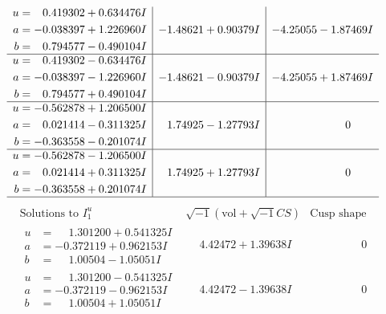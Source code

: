 \documentclass[1p]{elsarticle_modified}
\theoremstyle{definition}
\newcommand{\I}{\sqrt{-1}}
\begin{document}
$$\begin{array}{c|c|c}
\begin{aligned}
u &= \phantom{-}0.419302 + 0.634476 I \\
a &= -0.038397 + 1.226960 I \\
b &= \phantom{-}0.794577 - 0.490104 I\end{aligned}
 & -1.48621 + 0.90379 I & -4.25055 - 1.87469 I \\ \hline\begin{aligned}
u &= \phantom{-}0.419302 - 0.634476 I \\
a &= -0.038397 - 1.226960 I \\
b &= \phantom{-}0.794577 + 0.490104 I\end{aligned}
 & -1.48621 - 0.90379 I & -4.25055 + 1.87469 I \\ \hline\begin{aligned}
u &= -0.562878 + 1.206500 I \\
a &= \phantom{-}0.021414 - 0.311325 I \\
b &= -0.363558 - 0.201074 I\end{aligned}
 & \phantom{-}1.74925 - 1.27793 I & \phantom{-0.000000 } 0 \\ \hline\begin{aligned}
u &= -0.562878 - 1.206500 I \\
a &= \phantom{-}0.021414 + 0.311325 I \\
b &= -0.363558 + 0.201074 I\end{aligned}
 & \phantom{-}1.74925 + 1.27793 I & \phantom{-0.000000 } 0\\
 \hline 
 \end{array}$$\newpage$$\begin{array}{c|c|c}  
\text{Solutions to }I^u_{1}& \I (\text{vol} + \sqrt{-1}CS) & \text{Cusp shape}\\
 \hline 
\begin{aligned}
u &= \phantom{-}1.301200 + 0.541325 I \\
a &= -0.372119 + 0.962153 I \\
b &= \phantom{-}1.00504 - 1.05051 I\end{aligned}
 & \phantom{-}4.42472 + 1.39638 I & \phantom{-0.000000 } 0 \\ \hline\begin{aligned}
u &= \phantom{-}1.301200 - 0.541325 I \\
a &= -0.372119 - 0.962153 I \\
b &= \phantom{-}1.00504 + 1.05051 I\end{aligned}
 & \phantom{-}4.42472 - 1.39638 I & \phantom{-0.000000 } 0 \\ \hline\begin{aligned}

\end{aligned}
\end{array}$$
\end{document}
